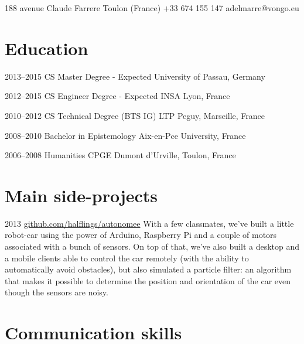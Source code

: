 \documentclass{tccv}
\begin{document}
\personal
    {188 avenue Claude Farrere  Toulon (France)}
    {+33 674 155 147}
    {adelmarre@vongo.eu}

\section{Education}

\begin{yearlist}

\item{2013--2015}
     {CS Master Degree - Expected}
     {University of Passau, Germany}
     
\item{2012--2015}
     {CS Engineer Degree - Expected}
     {INSA Lyon, France}
     
\item{2010--2012}
     {CS Technical Degree (BTS IG)}
     {LTP Peguy, Marseille, France}
     
\item{2008--2010}
     {Bachelor in Epistemology}
     {Aix-en-Pce University, France}
     
\item{2006--2008}
     {Humanities CPGE}
     {Dumont d'Urville, Toulon, France}

\end{yearlist}

\section{Main side-projects}

\begin{yearlist}

\item{2013}
     {\href{https://github.com/halflings/autonomee}{github.com/halflings/autonomee}}
     {With a few classmates, we've built a little robot-car using the power of Arduino, Raspberry Pi and a couple of motors associated with a bunch of sensors. On top of that, we've also built a desktop and a mobile clients able to control the car remotely (with the ability to automatically avoid obstacles), but also simulated a particle filter: an algorithm that makes it possible to determine the position and orientation of the car even though the sensors are noisy.}

\end{yearlist}

\section{Communication skills}
\end{document}

